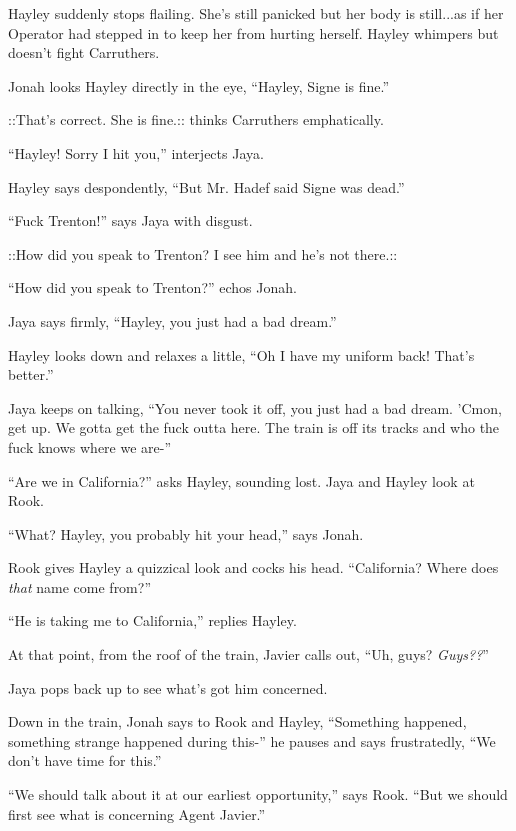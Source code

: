 Hayley suddenly stops flailing.  She's still panicked but her body is still...as if her Operator had stepped in to keep her from hurting herself.  Hayley whimpers but doesn't fight Carruthers.

Jonah looks Hayley directly in the eye,  ``Hayley, Signe is fine.''

 {\color[RGB]{153,0,255}::That's correct.  She is fine.::}  thinks Carruthers emphatically.

``Hayley!  Sorry I hit you,'' interjects Jaya.

Hayley says despondently, ``But Mr. Hadef said Signe was dead.''

``Fuck Trenton!'' says Jaya with disgust. 

 {\color[RGB]{153,0,255}::How did you speak to Trenton?  I see him and he's not there.::} 

``How did you speak to Trenton?'' echos Jonah.

Jaya says firmly, ``Hayley, you just had a bad dream.''

Hayley looks down and relaxes a little, ``Oh I have my uniform back!  That's better.''

Jaya keeps on talking, ``You never took it off, you just had a bad dream. 'Cmon, get up. We gotta get the fuck outta here.  The train is off its tracks and who the fuck knows where we are-'' 

``Are we in California?'' asks Hayley, sounding lost.  Jaya and Hayley look at Rook.

``What?  Hayley, you probably hit your head,'' says Jonah.

Rook gives Hayley a quizzical look and cocks his head.  ``California?  Where does \textit{that }name come from?''

``He is taking me to California,'' replies Hayley.



At that point, from the roof of the train, Javier calls out, ``Uh, guys? \textit{Guys??}''

Jaya pops back up to see what's got him concerned.



Down in the train, Jonah says to Rook and Hayley, ``Something happened, something strange happened during this-'' he pauses and says frustratedly, ``We don't have time for this.''

``We should talk about it at our earliest opportunity,'' says Rook.  ``But we should first see what is concerning Agent Javier.''

